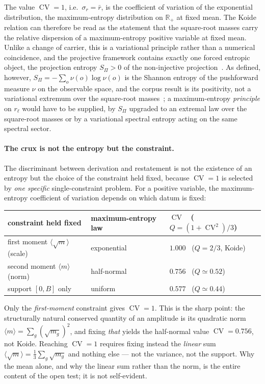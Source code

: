 \documentclass[11pt]{article}
\theoremstyle{definition}
\theoremstyle{remark}
\newcommand{\CV}{\operatorname{CV}}
\newcommand{\rl}{r_{\ell}}
\newcommand{\SPi}{S_{\Pi}}
\begin{document}
    The value $\CV = 1$, i.e.\ $\sigma_r = \bar r$, is the coefficient of variation of the exponential distribution,
    the maximum-entropy distribution on $\mathbb R_+$ at fixed mean.
    The Koide relation can therefore be read as the statement that the square-root masses carry the relative
    dispersion of a maximum-entropy positive variable at fixed mean.
    Unlike a change of carrier, this is a variational principle rather than a numerical coincidence, and the
    projective framework contains exactly one forced entropic object, the projection entropy $\SPi > 0$ of the
    non-injective projection~\cite{Beau2026l}.
    As defined, however, $\SPi = -\sum_{o} \nu(o) \log \nu(o)$ is the Shannon entropy of the pushforward measure
    $\nu$ on the observable space, and the corpus result is its positivity, not a variational extremum over the
    square-root masses~\cite{Beau2026l}; a maximum-entropy \emph{principle} on $\rl$ would have to be supplied, by
    $\SPi$ upgraded to an extremal law over the square-root masses or by a variational spectral entropy acting on
    the same spectral sector.

    \paragraph{The crux is not the entropy but the constraint.}
    The discriminant between derivation and restatement is not the existence of an entropy but the choice of the
    constraint held fixed, because $\CV = 1$ is selected by \emph{one specific} single-constraint problem.
    For a positive variable, the maximum-entropy coefficient of variation depends on which datum is fixed:
    \begin{center}
      \begin{tabular}{lll}
        \hline
        constraint held fixed & maximum-entropy law & $\CV$ \ ($Q = (1+\CV^2)/3$) \\
        \hline
        first moment $\langle \sqrt m \rangle$ (scale) & exponential & $1.000$ \ ($Q = 2/3$, Koide) \\
        second moment $\langle m \rangle$ (norm) & half-normal & $0.756$ \ ($Q \simeq 0.52$) \\
        support $[0,B]$ only & uniform & $0.577$ \ ($Q \simeq 0.44$) \\
        \hline
      \end{tabular}
    \end{center}
    Only the \emph{first-moment} constraint gives $\CV = 1$.
    This is the sharp point: the structurally natural conserved quantity of an amplitude is its quadratic norm
    $\langle m \rangle = \sum_g (\sqrt{m_g})^2$, and fixing \emph{that} yields the half-normal value $\CV = 0.756$,
    not Koide.
    Reaching $\CV = 1$ requires fixing instead the \emph{linear} sum $\langle \sqrt m \rangle = \tfrac13 \sum_g
    \sqrt{m_g}$ and nothing else --- not the variance, not the support.
    Why the mean alone, and why the linear sum rather than the norm, is the entire content of the open test; it is
    not self-evident.
\end{document}
